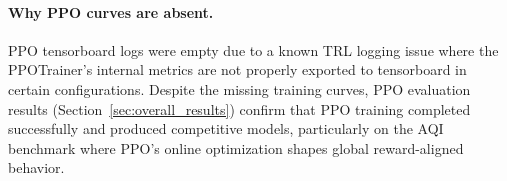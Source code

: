 \paragraph{Why PPO curves are absent.}
PPO tensorboard logs were empty due to a known TRL logging issue where the PPOTrainer's internal metrics are not properly exported to tensorboard in certain configurations.
Despite the missing training curves, PPO evaluation results (Section~\ref{sec:overall_results}) confirm that PPO training completed successfully and produced competitive models, particularly on the AQI benchmark where PPO's online optimization shapes global reward-aligned behavior.



